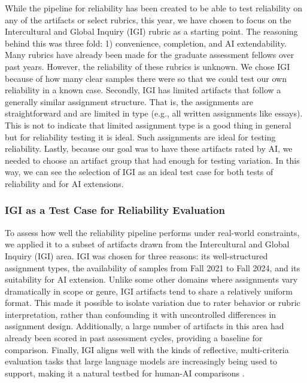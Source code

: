 \documentclass[12pt]{article}%
\begin{document}
While the pipeline for reliability has been created to be able to test reliability on any of the artifacts or select rubrics, this year, we have chosen to focus on the Intercultural and Global Inquiry (IGI) rubric as a starting point. The reasoning behind this was three fold: 1) convenience, completion, and AI extendability. Many rubrics have already been made for the graduate assessment fellows over past years. However, the reliability of these rubrics is unknown. We chose IGI because of how many clear samples there were so that we could test our own reliability in a known case. Secondly, IGI has limited artifacts that follow a generally similar assignment structure. That is, the assignments are straightforward and are limited in type (e.g., all written assignments like essays). This is not to indicate that limited assignment type is a good thing in general but for reliability testing it is ideal. Such assignments are ideal for testing reliability. Lastly, because our goal was to have these artifacts rated by AI, we needed to choose an artifact group that had enough for testing variation. In this way, we can see the selection of IGI as an ideal test case for both tests of reliability and for AI extensions.

\subsubsection*{IGI as a Test Case for Reliability Evaluation}

To assess how well the reliability pipeline performs under real-world constraints, we applied it to a subset of artifacts drawn from the Intercultural and Global Inquiry (IGI) area. IGI was chosen for three reasons: its well-structured assignment types, the availability of samples from Fall 2021 to Fall 2024, and its suitability for AI extension. Unlike some other domains where assignments vary dramatically in scope or genre, IGI artifacts tend to share a relatively uniform format. This made it possible to isolate variation due to rater behavior or rubric interpretation, rather than confounding it with uncontrolled differences in assignment design. Additionally, a large number of artifacts in this area had already been scored in past assessment cycles, providing a baseline for comparison. Finally, IGI aligns well with the kinds of reflective, multi-criteria evaluation tasks that large language models are increasingly being used to support, making it a natural testbed for human-AI comparisons \cite{li2025, wang2025}.
\end{document}
